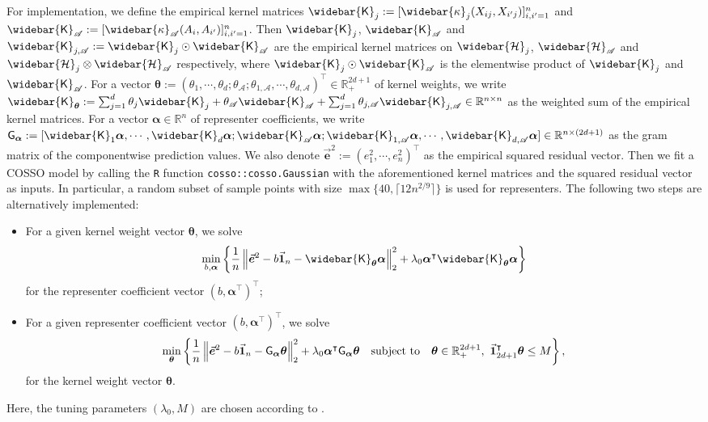 \documentclass[11pt]{article}
\numberwithin{equation}{section}
\theoremstyle{definition}
\theoremstyle{remark}
\newcommand{\be}{\bm{e}}
\newcommand{\balpha}{\bm{\alpha}}
\newcommand{\btheta}{\bm{\theta}}
\newcommand{\bbR}{\mathbb{R}}
\newcommand{\cH}{\mathcal{H}}
\newcommand{\sA}{\mathscr{A}}
\newcommand{\sfG}{\mathsf{G}}
\newcommand{\sfK}{\mathsf{K}}
\newcommand{\bone}{\mathbf{1}}	%
\begin{document}
For implementation, we define the empirical kernel matrices $ \widebar{\sfK}_{j} := [\widebar{\kappa}_{j}(X_{ij},X_{i'j})]_{i,i'=1}^{n} $ and $ \widebar{\sfK}_{\sA} := [\widebar{\kappa}_{\sA}(A_{i},A_{i'})]_{i,i'=1}^{n} $. Then $ \widebar{\sfK}_{j} $, $ \widebar{\sfK}_{\sA} $ and $ \widebar{\sfK}_{j,\sA} := \widebar{\sfK}_{j} \odot \widebar{\sfK}_{\sA} $ are the empirical kernel matrices on $ \widebar{\cH}_{j} $, $ \widebar{\cH}_{\sA} $ and $ \widebar{\cH}_{j} \otimes \widebar{\cH}_{\sA} $ respectively, where $ \widebar{\sfK}_{j} \odot \widebar{\sfK}_{\sA} $ is the elementwise product of $ \widebar{\sfK}_{j} $ and $ \widebar{\sfK}_{\sA} $. For a vector $ \btheta := (\theta_{1},\cdots,\theta_{d};\theta_{\sA};\theta_{1,\sA},\cdots,\theta_{d,\sA})^{\intercal} \in \bbR_{+}^{2d+1} $ of kernel weights, we write $ \widebar{\sfK}_{\btheta} := \sum_{j=1}^{d}\theta_{j}\widebar{\sfK}_{j} + \theta_{\sA}\widebar{\sfK}_{\sA} + \sum_{j=1}^{d}\theta_{j,\sA}\widebar{\sfK}_{j,\sA} \in \bbR^{n\times n} $ as the weighted sum of the empirical kernel matrices. For a vector $ \balpha \in \bbR^{n} $ of representer coefficients, we write $ \sfG_{\balpha} := [\widebar{\sfK}_{1}\balpha,\cdots,\widebar{\sfK}_{d}\balpha;\widebar{\sfK}_{\sA}\balpha;\widebar{\sfK}_{1,\sA}\balpha,\cdots,\widebar{\sfK}_{d,\sA}\balpha] \in \bbR^{n\times (2d+1)} $ as the gram matrix of the componentwise prediction values. We also denote $ \vec{\be}^{2} := (e_{1}^{2},\cdots,e_{n}^{2})^{\intercal} $ as the empirical squared residual vector. Then we fit a COSSO model by calling the \texttt{R} function \texttt{cosso::cosso.Gaussian} with the aforementioned kernel matrices and the squared residual vector as inputs. In particular, a random subset of sample points with size $ \max\{40,\lceil 12n^{2/9} \rceil\} $ is used for representers. The following two steps are alternatively implemented:
\begin{itemize}
	\item For a given kernel weight vector $ \btheta $, we solve
	\[ \min_{b,\balpha}\left\{ {1 \over n}\left\| \vec{\be}^{2} - b\vec{\bone}_{n} - \widebar{\sfK}_{\btheta}\balpha \right\|_{2}^{2} + \lambda_{0}\balpha^{\intercal}\widebar{\sfK}_{\btheta}\balpha\right\} \]
	for the representer coefficient vector $ (b,\balpha^{\intercal})^{\intercal} $;
	
	\item For a given representer coefficient vector $ (b,\balpha^{\intercal})^{\intercal} $, we solve
	\[ \min_{\btheta}\left\{ {1 \over n}\left\| \vec{\be}^{2} - b\vec{\bone}_{n} - \sfG_{\balpha}\btheta \right\|_{2}^{2} + \lambda_{0}\balpha^{\intercal}\sfG_{\balpha}\btheta \quad \text{subject to} \quad \btheta \in \bbR_{+}^{2d+1}, ~ \vec{\bone}_{2d+1}^{\intercal}\btheta \le M \right\}, \]
	for the kernel weight vector $ \btheta $.
\end{itemize}
Here, the tuning parameters $ (\lambda_{0},M) $ are chosen according to \citet[Section 6]{lin2006component}. 
\end{document}
